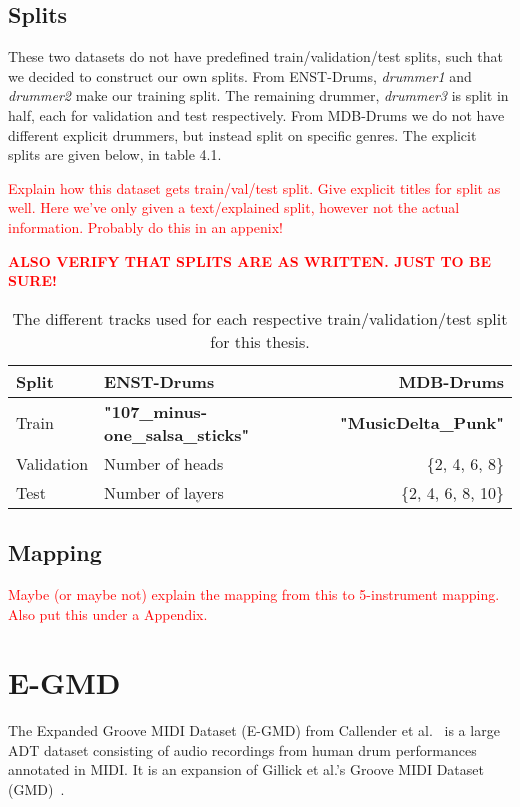 \subsection{Splits}

These two datasets do not have predefined train/validation/test splits, such that we decided to construct our own splits. From ENST-Drums, \textit{drummer1} and \textit{drummer2} make our training split. The remaining drummer, \textit{drummer3} is split in half, each for validation and test respectively. From MDB-Drums we do not have different explicit drummers, but instead split on specific genres. The explicit splits are given below, in table 4.1.

\textcolor{red}{Explain how this dataset gets train/val/test split. Give explicit titles for split as well. Here we've only given a text/explained split, however not the actual information. Probably do this in an appenix!}

\textcolor{red}{\textbf{ALSO VERIFY THAT SPLITS ARE AS WRITTEN. JUST TO BE SURE!}}


\begin{table}[H]
    \centering
    \begin{tabular}{l|lr}
        Split & ENST-Drums & MDB-Drums \\
        \hline
        Train & \textbf{"107\_minus-one\_salsa\_sticks"}      & \textbf{"MusicDelta\_Punk"} \\
        Validation & Number of heads     & \{2, 4, 6, 8\} \\
        Test & Number of layers      & \{2, 4, 6, 8, 10\} \\
    \end{tabular}
    \caption{The different tracks used for each respective train/validation/test split for this thesis.}
    \label{ENST+MDBSplits}
\end{table}

\subsection{Mapping}

\textcolor{red}{Maybe (or maybe not) explain the mapping from this to 5-instrument mapping. Also put this under a Appendix.}

\section{E-GMD}

The Expanded Groove MIDI Dataset (E-GMD) from Callender et al.~\cite{callender2020improving} is a large \gls{ADT} dataset consisting of audio recordings from human drum performances annotated in MIDI. It is an expansion of Gillick et al.'s Groove MIDI Dataset (GMD)~\cite{pmlr-v97-gillick19a}.

